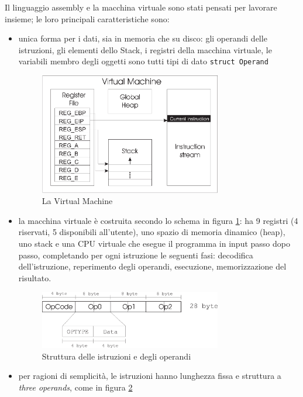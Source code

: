 \documentclass[a4paper, 11pt]{article}
\newcommand{\code}[1]{\scriptsize{\texttt{#1}}\normalsize}
\begin{document}
Il linguaggio assembly e la macchina virtuale sono stati pensati per lavorare insieme; le loro principali caratteristiche sono:
\begin{itemize}
\item unica forma per i dati, sia in memoria che su disco: gli operandi delle istruzioni, gli elementi dello Stack, i registri della macchina virtuale, le variabili membro degli oggetti sono tutti tipi di dato \code{struct Operand}

\begin{figure}[ht]
\centering
\includegraphics[width=0.75\textwidth]{vm.eps}
\caption{La Virtual Machine}
\label{fig:vm}
\end{figure}

\item
la macchina virtuale \`e costruita secondo lo schema in figura \ref{fig:vm}: ha 9 registri (4 riservati, 5 disponibili all'utente), uno spazio di memoria dinamico (heap), uno stack e una CPU virtuale che esegue il programma in input passo dopo passo, completando per ogni istruzione le seguenti fasi: decodifica dell'istruzione, reperimento degli operandi, esecuzione, memorizzazione del risultato.

\begin{figure}[ht]
\centering
\includegraphics[width=0.75\textwidth]{instr.eps}
\caption{Struttura delle istruzioni e degli operandi}
\label{fig:instr}
\end{figure}

\item per ragioni di semplicit\`a, le istruzioni hanno lunghezza fissa e struttura a \emph{three operands}, come in figura \ref{fig:instr}



\end{itemize}
\end{document}
